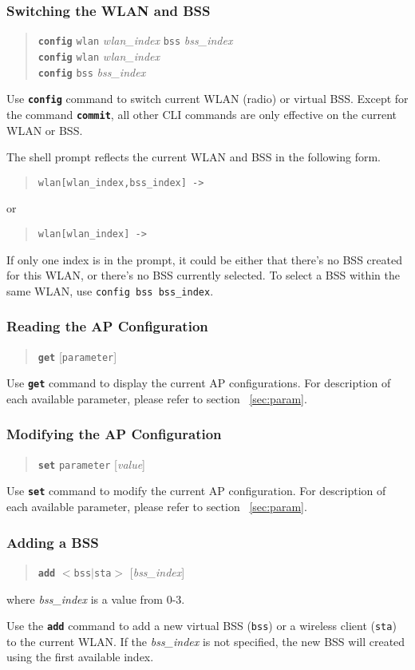 \documentclass[10pt,fullpage]{article}
\newcommand{\mytt}[1]{{\texttt{#1}}}
\newcommand{\bv}{\begin{verse}}
\newcommand{\ev}{\end{verse}}
\newcommand{\clicmd}[1]{{\textbf{\texttt{#1}}}}
\newcommand{\cliparam}[1]{{\texttt{#1}}}
\newcommand{\clival}[1]{{\emph{#1}}}
\begin{document}
\subsubsection{Switching the WLAN and BSS}
\bv
\clicmd{config} \cliparam{wlan} \clival{wlan\_index} \cliparam{bss}
\clival{bss\_index}\\
\clicmd{config} \cliparam{wlan} \clival{wlan\_index}\\
\clicmd{config} \cliparam{bss} \clival{bss\_index}\\
\ev

Use \clicmd{config} command to switch current WLAN (radio) or virtual BSS. 
Except for the command \clicmd{commit}, all other CLI commands are only effective on the
current WLAN or BSS.

The shell prompt reflects the current WLAN and BSS in the following form.
\bv
\mytt{wlan[wlan\_index,bss\_index] ->} 
\ev
or
\bv
\mytt{wlan[wlan\_index] -> }
\ev
If only one index is in the prompt, it could be either that there's no BSS
created for this WLAN, or there's no BSS currently selected. To select a BSS
within the same WLAN, use \mytt{config bss bss\_index}.

\subsubsection{Reading the AP Configuration}
\bv
\clicmd{get} [\cliparam{parameter}]
\ev
Use \clicmd{get} command to display the current AP configurations.
For description of each available parameter, please refer to section
~\ref{sec:param}. 

\subsubsection{Modifying the AP Configuration}
\bv
\clicmd{set} \cliparam{parameter} [\clival{value}]
\ev
Use \clicmd{set} command to modify the current AP configuration.
For description of each available parameter, please refer to section
~\ref{sec:param}.

\subsubsection{Adding a BSS}
\bv
\clicmd{add} $<$\cliparam{bss}$|$\cliparam{sta}$>$ [\clival{bss\_index}]
\ev
where \clival{bss\_index} is a value from 0-3.

Use the \clicmd{add} command to add a new virtual BSS (\cliparam{bss}) or
a wireless client (\cliparam{sta}) to the current WLAN. 
If the \clival{bss\_index} is not specified, the new BSS will created
using the first available index.
\end{document}
